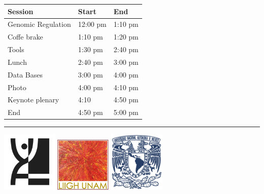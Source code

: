 \documentclass[]{article}
\begin{document}
\begin{longtable}[]{@{}lll@{}}
\toprule
Session & Start & End\tabularnewline
\midrule
\endhead
Genomic Regulation & 12:00 pm & 1:10 pm\tabularnewline
 Coffe brake & 1:10 pm & 1:20 pm\tabularnewline
Tools & 1:30 pm & 2:40 pm\tabularnewline
 Lunch & 2:40 pm & 3:00 pm\tabularnewline
Data Bases & 3:00 pm & 4:00 pm\tabularnewline
 Photo & 4:00 pm & 4:10 pm\tabularnewline
Keynote plenary & 4:10 & 4:50 pm\tabularnewline
End & 4:50 pm & 5:00 pm\tabularnewline
\bottomrule
\end{longtable}

\begin{center}\rule{0.5\linewidth}{\linethickness}\end{center}

\includegraphics[width=0.20000\textwidth]{Pictures/logo.png}
\includegraphics[width=0.20000\textwidth]{Pictures/liigh.png}
\includegraphics[width=0.20000\textwidth]{Pictures/UNAM.jpg}
\end{document}
